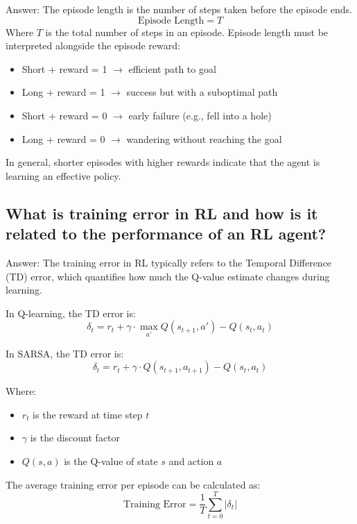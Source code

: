 \documentclass[11pt,a4paper]{article}
\begin{document}
Answer: The episode length is the number of steps taken before the episode ends.
\begin{equation}
\text{Episode Length} = T
\end{equation}
Where $T$ is the total number of steps in an episode.
Episode length must be interpreted alongside the episode reward:
\begin{itemize}
    \item Short + reward = 1 $\rightarrow$ efficient path to goal
    \item Long + reward = 1 $\rightarrow$ success but with a suboptimal path
    \item Short + reward = 0 $\rightarrow$ early failure (e.g., fell into a hole)
    \item Long + reward = 0 $\rightarrow$ wandering without reaching the goal
\end{itemize}
In general, shorter episodes with higher rewards indicate that the agent is learning an effective policy.

\subsection{What is training error in RL and how is it related to the performance of an RL agent?}

Answer: The training error in RL typically refers to the Temporal Difference (TD) error, which quantifies how much the Q-value estimate changes during learning.

In Q-learning, the TD error is:
\begin{equation}
\delta_t = r_t + \gamma \cdot \max_{a'} Q(s_{t+1}, a') - Q(s_t, a_t)
\end{equation}

In SARSA, the TD error is:
\begin{equation}
\delta_t = r_t + \gamma \cdot Q(s_{t+1}, a_{t+1}) - Q(s_t, a_t)
\end{equation}

Where:
\begin{itemize}
    \item $r_t$ is the reward at time step $t$
    \item $\gamma$ is the discount factor
    \item $Q(s,a)$ is the Q-value of state $s$ and action $a$
\end{itemize}

The average training error per episode can be calculated as:
\begin{equation}
\text{Training Error} = \frac{1}{T} \sum_{t=0}^{T} |\delta_t|
\end{equation}
\end{document}
